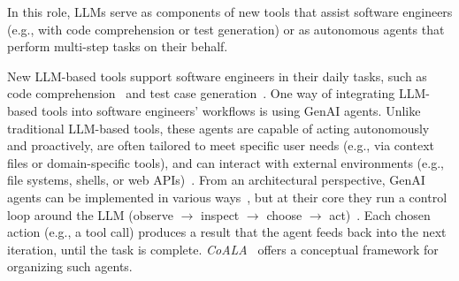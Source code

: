 \label{sec:llms-for-new-software-engineering-tools}

In this role, LLMs serve as components of new tools that assist software engineers (e.g., with code comprehension or test generation) or as autonomous agents that perform multi-step tasks on their behalf.


New LLM-based tools support software engineers in their daily tasks, such as code comprehension~\cite{DBLP:conf/chi/YanHWH24} and test case generation~\cite{DBLP:journals/tse/SchaferNET24}.
One way of integrating LLM-based tools into software engineers' workflows is using GenAI agents.
Unlike traditional LLM-based tools, these agents are capable of acting autonomously and proactively, are often tailored to meet specific user needs (e.g., via context files or domain-specific tools), and can interact with external environments (e.g., file systems, shells, or web APIs)~\cite{wiesinger2025agents,yang2025code}.
From an architectural perspective, GenAI agents can be implemented in various ways~\cite{wiesinger2025agents}, but at their core they run a control loop around the LLM (observe $\rightarrow$ inspect $\rightarrow$ choose $\rightarrow$ act)~\cite{raschka2026components}.
Each chosen action (e.g., a tool call) produces a result that the agent feeds back into the next iteration, until the task is complete.
\emph{CoALA}~\cite{DBLP:journals/tmlr/SumersYN024} offers a conceptual framework for organizing such agents.
